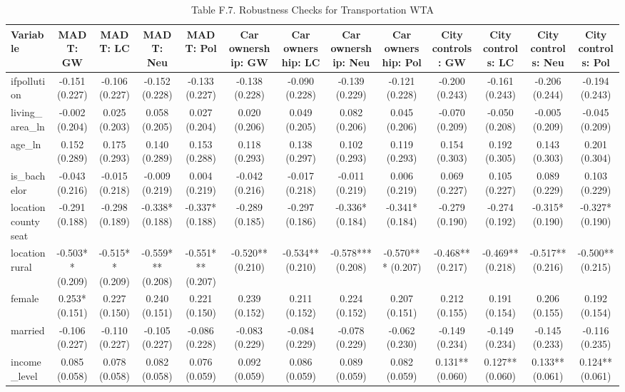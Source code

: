 \begin{table}[!htbp]
\centering
\caption{Table F.7. Robustness Checks for Transportation WTA}
\begin{tabular}{lcccccccccccc}
\hline
Variable & MADT: GW & MADT: LC & MADT: Neu & MADT: Pol & Car ownership: GW & Car ownership: LC & Car ownership: Neu & Car ownership: Pol & City controls: GW & City controls: LC & City controls: Neu & City controls: Pol \\
\hline
ifpollution & -0.151 (0.227) & -0.106 (0.227) & -0.152 (0.228) & -0.133 (0.227) & -0.138 (0.228) & -0.090 (0.228) & -0.139 (0.229) & -0.121 (0.228) & -0.200 (0.243) & -0.161 (0.243) & -0.206 (0.244) & -0.194 (0.243) \\
living\_area\_ln & -0.002 (0.204) & 0.025 (0.203) & 0.058 (0.205) & 0.027 (0.204) & 0.020 (0.206) & 0.049 (0.205) & 0.082 (0.206) & 0.045 (0.206) & -0.070 (0.209) & -0.050 (0.208) & -0.005 (0.209) & -0.045 (0.209) \\
age\_ln & 0.152 (0.289) & 0.175 (0.293) & 0.140 (0.289) & 0.153 (0.288) & 0.118 (0.293) & 0.138 (0.297) & 0.102 (0.293) & 0.119 (0.293) & 0.154 (0.303) & 0.192 (0.305) & 0.143 (0.303) & 0.201 (0.304) \\
is\_bachelor & -0.043 (0.216) & -0.015 (0.218) & -0.009 (0.219) & 0.004 (0.219) & -0.042 (0.216) & -0.017 (0.218) & -0.011 (0.219) & 0.006 (0.219) & 0.069 (0.227) & 0.105 (0.227) & 0.089 (0.229) & 0.103 (0.229) \\
locationcounty seat & -0.291 (0.188) & -0.298 (0.189) & -0.338* (0.188) & -0.337* (0.188) & -0.289 (0.185) & -0.297 (0.186) & -0.336* (0.184) & -0.341* (0.184) & -0.279 (0.190) & -0.274 (0.192) & -0.315* (0.190) & -0.327* (0.190) \\
locationrural & -0.503** (0.209) & -0.515** (0.209) & -0.559*** (0.208) & -0.551*** (0.207) & -0.520** (0.210) & -0.534** (0.210) & -0.578*** (0.208) & -0.570*** (0.207) & -0.468** (0.217) & -0.469** (0.218) & -0.517** (0.216) & -0.500** (0.215) \\
female & 0.253* (0.151) & 0.227 (0.150) & 0.240 (0.151) & 0.221 (0.150) & 0.239 (0.152) & 0.211 (0.152) & 0.224 (0.152) & 0.207 (0.151) & 0.212 (0.155) & 0.191 (0.154) & 0.206 (0.155) & 0.192 (0.154) \\
married & -0.106 (0.227) & -0.110 (0.227) & -0.105 (0.227) & -0.086 (0.228) & -0.083 (0.229) & -0.084 (0.229) & -0.078 (0.229) & -0.062 (0.230) & -0.149 (0.234) & -0.149 (0.234) & -0.145 (0.233) & -0.116 (0.235) \\
income\_level & 0.085 (0.058) & 0.078 (0.058) & 0.082 (0.058) & 0.076 (0.059) & 0.092 (0.059) & 0.086 (0.059) & 0.089 (0.059) & 0.082 (0.059) & 0.131** (0.060) & 0.127** (0.060) & 0.133** (0.061) & 0.124** (0.061) \\

\end{tabular}
\end{table}
